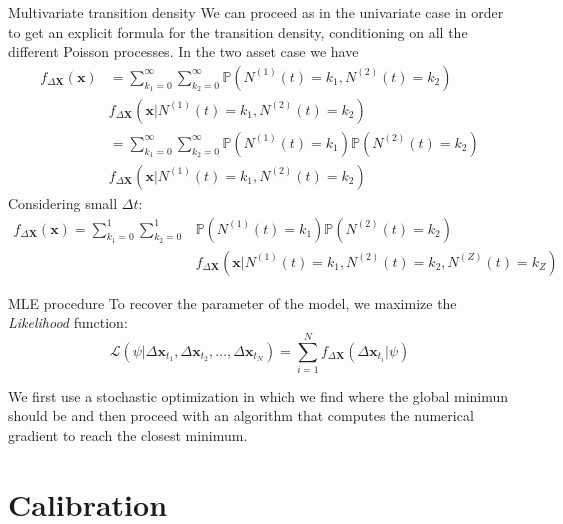 \documentclass{beamer}
\begin{document}
\begin{frame}{Multivariate transition density}
We can proceed as in the univariate case in order to get an explicit formula for the transition density, conditioning on all the different Poisson processes. In the two asset case we have
\begin{equation*}
\begin{aligned}
    f_{\Delta\mathbf{X}}(\mathbf{x}) &= \sum_{k_1=0}^{\infty}\sum_{k_2=0}^{\infty} \mathbb{P}(N^{(1)}(t) = k_1, N^{(2)}(t)=k_2) \\
    &f_{\Delta\mathbf{X}}(\mathbf{x} | N^{(1)}(t) = k_1, N^{(2)}(t)=k_2)\\
    &= \sum_{k_1=0}^{\infty}\sum_{k_2=0}^{\infty}\mathbb{P}(N^{(1)}(t) = k_1) \mathbb{P}(N^{(2)}(t)=k_2)\\
    &f_{\Delta\mathbf{X}}(\mathbf{x} | N^{(1)}(t) = k_1, N^{(2)}(t)=k_2)
\end{aligned}
\end{equation*}
Considering small $\Delta t$:
\begin{equation*}
\begin{aligned}
        f_{\Delta\mathbf{X}}(\mathbf{x}) = \sum_{k_1=0}^{1}\sum_{k_2=0}^{1} &\mathbb{P}(N^{(1)}(t) = k_1) \mathbb{P}(N^{(2)}(t)=k_2)\\ &f_{\Delta\mathbf{X}}(\mathbf{x}| N^{(1)}(t) = k_1, N^{(2)}(t)=k_2, N^{(Z)}(t)=k_Z )
\end{aligned}
\end{equation*}

\end{frame}

\begin{frame}{MLE procedure}
To recover the parameter of the model, we maximize the \textit{Likelihood} function:
    \begin{equation}
    \mathcal{L}(\psi | \Delta \mathbf{x}_{t_1},\Delta \mathbf{x}_{t_2},\dots,\Delta \mathbf{x}_{t_N}) = \sum_{i=1}^{N} f_{\Delta \mathbf{X}}(\Delta\mathbf{x}_{t_i} | \psi)
\end{equation}

We first use a stochastic optimization in which we find where the global minimun should be and then proceed with an algorithm that computes the numerical gradient to reach the closest minimum.

\end{frame}
\section{Calibration}
\end{document}
